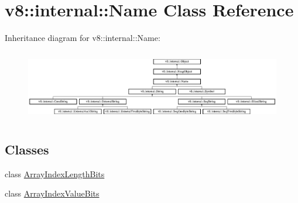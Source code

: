 \hypertarget{classv8_1_1internal_1_1_name}{}\section{v8\+:\+:internal\+:\+:Name Class Reference}
\label{classv8_1_1internal_1_1_name}
Inheritance diagram for v8\+:\+:internal\+:\+:Name\+:\begin{figure}[H]
\begin{center}
\leavevmode
\includegraphics[height=3.125581cm]{classv8_1_1internal_1_1_name}
\end{center}
\end{figure}
\subsection*{Classes}
\begin{DoxyCompactItemize}
\item 
class \hyperlink{classv8_1_1internal_1_1_name_1_1_array_index_length_bits}{Array\+Index\+Length\+Bits}
\item 
class \hyperlink{classv8_1_1internal_1_1_name_1_1_array_index_value_bits}{Array\+Index\+Value\+Bits}
\end{DoxyCompactItemize}
